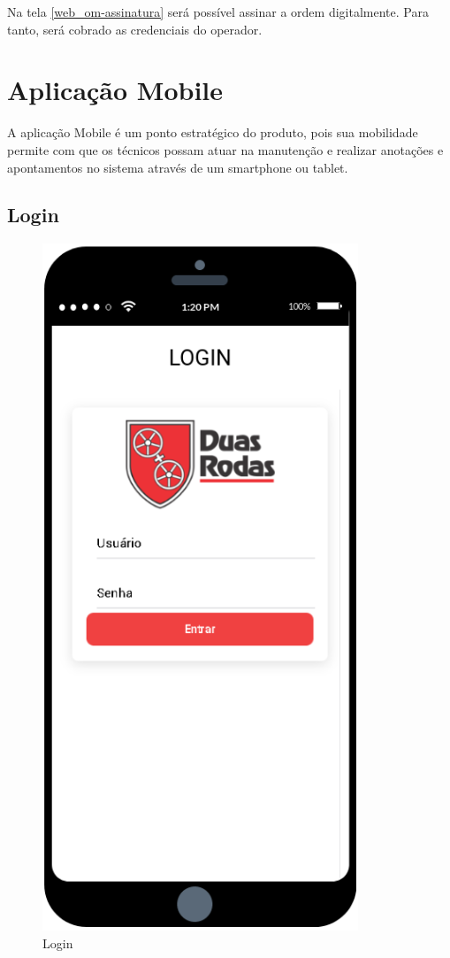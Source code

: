 Na tela \ref{web_om-assinatura} será possível assinar a ordem digitalmente. Para tanto, será cobrado as credenciais do operador.

\newpage
\section{Aplicação Mobile}
A aplicação Mobile é um ponto estratégico do produto, pois sua mobilidade permite com que os técnicos possam atuar na manutenção e realizar anotações e apontamentos no sistema através de um smartphone ou tablet.

\subsection{Login}

\begin{figure}[htb]
	\caption{\label{mobile_login}Login}
	\begin{center}
		\includegraphics[scale=0.80]{./Figuras/mobile/login.png}
	\end{center}
\end{figure}

